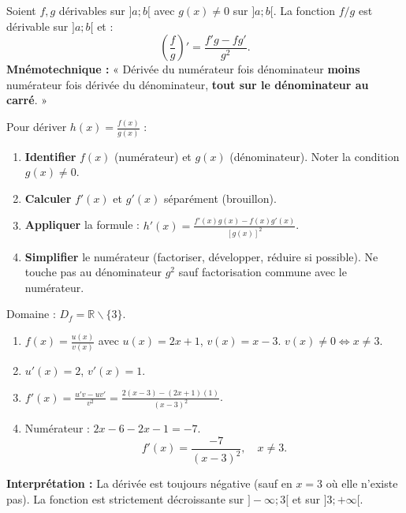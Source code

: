 \documentclass[11pt]{article}
\def\setminus{\mathbin{\backslash}}\let\smallsetminus\setminus
\begin{document}
\begin{propriete}
Soient $f, g$ dérivables sur $]a;b[$ avec $g(x) \neq 0$ sur $]a;b[$. La fonction $f/g$ est dérivable sur $]a;b[$ et :
\[ \left( \frac{f}{g} \right)' = \frac{f'g - fg'}{g^2}. \]
\textbf{Mnémotechnique :} « Dérivée du numérateur fois dénominateur \textbf{moins} numérateur fois dérivée du dénominateur, \textbf{tout sur le dénominateur au carré}. »
\end{propriete}

\begin{methode}
Pour dériver $h(x) = \frac{f(x)}{g(x)}$ :
\begin{enumerate}
    \item \textbf{Identifier} $f(x)$ (numérateur) et $g(x)$ (dénominateur). Noter la condition $g(x) \neq 0$.
    \item \textbf{Calculer} $f'(x)$ et $g'(x)$ séparément (brouillon).
    \item \textbf{Appliquer} la formule : $h'(x) = \frac{f'(x)g(x) - f(x)g'(x)}{[g(x)]^2}$.
    \item \textbf{Simplifier} le numérateur (factoriser, développer, réduire si possible). Ne touche pas au dénominateur $g^2$ sauf factorisation commune avec le numérateur.
\end{enumerate}
\end{methode}

\begin{exemplebox}[Quotient : $f(x) = \frac{2x+1}{x-3}$]
Domaine : $D_f = \mathbb{R} \setminus \{3\}$.
\begin{enumerate}
    \item $f(x) = \frac{u(x)}{v(x)}$ avec $u(x)=2x+1$, $v(x)=x-3$. $v(x) \neq 0 \Leftrightarrow x \neq 3$.
    \item $u'(x) = 2$, $v'(x) = 1$.
    \item $f'(x) = \frac{u'v - uv'}{v^2} = \frac{2(x-3) - (2x+1)(1)}{(x-3)^2}$.
    \item Numérateur : $2x - 6 - 2x - 1 = -7$.
    \[ f'(x) = \frac{-7}{(x-3)^2}, \quad x \neq 3. \]
\end{enumerate}
\textbf{Interprétation :} La dérivée est toujours négative (sauf en $x=3$ où elle n'existe pas). La fonction est strictement décroissante sur $]-\infty;3[$ et sur $]3;+\infty[$.
\end{exemplebox}
\end{document}
